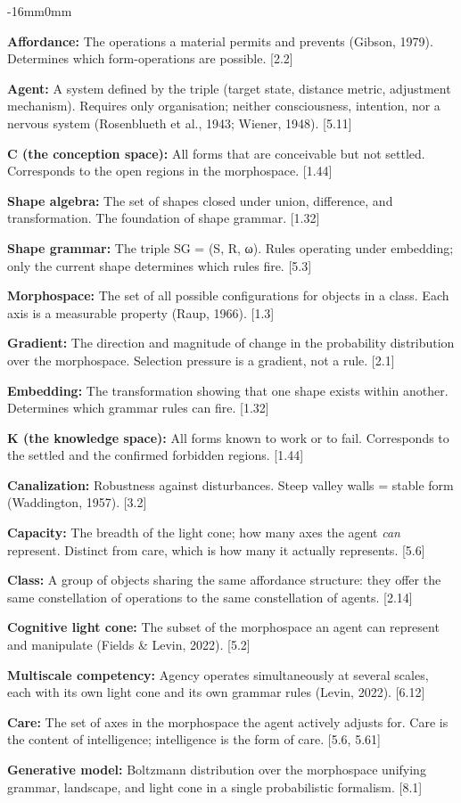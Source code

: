 \documentclass[10pt,oneside]{book}
\newcommand{\msym}[1]{{\mathfbfont #1}}
\newcommand{\silentchapter}[2]{%
  \clearpage
  \markboth{#2}{}%
  \addcontentsline{toc}{chapter}{#1}%
}
\newenvironment{ordliste}{%
  \begingroup\footnotesize\setlength{\parskip}{0.3pt plus 0.1pt}%
  \linespread{0.92}\selectfont
}{%
  \endgroup
}
\newcommand{\ordlisteentry}[2]{%
  \par\addvspace{1.5pt}%
  \noindent\textbf{#1:} #2\par%
}
\newenvironment{widebody}{%
  \begin{adjustwidth}{-16mm}{0mm}%
}{%
  \end{adjustwidth}%
}
\begin{document}
\silentchapter{Glossary}{glossary}
\begin{widebody}
\begin{ordliste}
\ordlisteentry{Affordance}{The operations a material permits and prevents (Gibson, 1979). Determines which form-operations are possible. [2.2]}
\ordlisteentry{Agent}{A system defined by the triple (target state, distance metric, adjustment mechanism). Requires only organisation; neither consciousness, intention, nor a nervous system (Rosenblueth et al., 1943; Wiener, 1948). [5.11]}
\ordlisteentry{C (the conception space)}{All forms that are conceivable but not settled. Corresponds to the open regions in the morphospace. [1.44]}
\ordlisteentry{Shape algebra}{The set of shapes closed under union, difference, and transformation. The foundation of shape grammar. [1.32]}
\ordlisteentry{Shape grammar}{The triple SG = (S, R, \msym{ω}). Rules operating under embedding; only the current shape determines which rules fire. [5.3]}
\ordlisteentry{Morphospace}{The set of all possible configurations for objects in a class. Each axis is a measurable property (Raup, 1966). [1.3]}
\ordlisteentry{Gradient}{The direction and magnitude of change in the probability distribution over the morphospace. Selection pressure is a gradient, not a rule. [2.1]}
\ordlisteentry{Embedding}{The transformation showing that one shape exists within another. Determines which grammar rules can fire. [1.32]}
\ordlisteentry{K (the knowledge space)}{All forms known to work or to fail. Corresponds to the settled and the confirmed forbidden regions. [1.44]}
\ordlisteentry{Canalization}{Robustness against disturbances. Steep valley walls = stable form (Waddington, 1957). [3.2]}
\ordlisteentry{Capacity}{The breadth of the light cone; how many axes the agent \textit{can} represent. Distinct from care, which is how many it actually represents. [5.6]}
\ordlisteentry{Class}{A group of objects sharing the same affordance structure: they offer the same constellation of operations to the same constellation of agents. [2.14]}
\ordlisteentry{Cognitive light cone}{The subset of the morphospace an agent can represent and manipulate (Fields \& Levin, 2022). [5.2]}
\ordlisteentry{Multiscale competency}{Agency operates simultaneously at several scales, each with its own light cone and its own grammar rules (Levin, 2022). [6.12]}
\ordlisteentry{Care}{The set of axes in the morphospace the agent actively adjusts for. Care is the content of intelligence; intelligence is the form of care. [5.6, 5.61]}
\ordlisteentry{Generative model}{Boltzmann distribution over the morphospace unifying grammar, landscape, and light cone in a single probabilistic formalism. [8.1]}

\end{ordliste}
\end{widebody}
\end{document}
